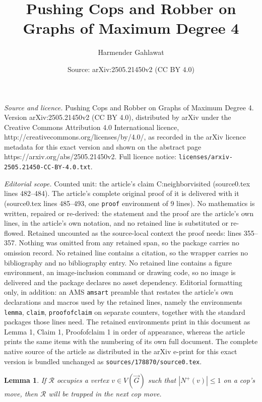 \documentclass[10pt,a4paper]{amsart}
\title{Pushing Cops and Robber on Graphs of Maximum Degree 4}
\author{Harmender Gahlawat}
\date{Source: arXiv:2505.21450v2 (CC BY 4.0)}
\newtheorem{lemma}{Lemma}
\newcommand{\R}{\mathcal{R}}
\begin{document}
\maketitle

\noindent\emph{Source and licence.} Pushing Cops and Robber on Graphs of Maximum Degree 4. Version arXiv:2505.21450v2 (CC BY 4.0), distributed by arXiv under the Creative Commons Attribution 4.0 International licence, http://creativecommons.org/licenses/by/4.0/, as recorded in the arXiv licence metadata for this exact version and shown on the abstract page https://arxiv.org/abs/2505.21450v2. Full licence notice: \texttt{licenses/arxiv-2505.21450-CC-BY-4.0.txt}.\par\smallskip

\noindent\textit{Editorial scope.} Counted unit: the article's claim C:neighborvisited (source0.tex lines 482--484). The article's complete original proof of it is delivered with it (source0.tex lines 485--493, one \texttt{proof} environment of 9 lines). No mathematics is written, repaired or re-derived: the statement and the proof are the article's own lines, in the article's own notation, and no retained line is substituted or re-flowed.  Retained uncounted as the source-local context the proof needs: lines 355--357.  Nothing was omitted from any retained span, so the package carries no omission record.  No retained line contains a citation, so the wrapper carries no bibliography and no bibliography entry.  No retained line contains a figure environment, an image-inclusion command or drawing code, so no image is delivered and the package declares no asset dependency.  Editorial formatting only, in addition: an AMS \texttt{amsart} preamble that restates the article's own declarations and macros used by the retained lines, namely the environments \texttt{lemma}, \texttt{claim}, \texttt{proofofclaim} on separate counters, together with the standard packages those lines need.  The retained environments print in this document as Lemma 1, Claim 1, Proofofclaim 1 in order of appearance, whereas the article prints the same items with the numbering of its own full document.  The complete native source of the article as distributed in the arXiv e-print for this exact version is bundled unchanged as \texttt{sources/178870/source0.tex}.
\begin{lemma}\label{L:trivial}
    If $\R$ occupies a vertex $v\in V(\overrightarrow{G})$ such that $|N^+(v)| \leq 1$ on a cop's move, then $\R$ will be trapped in the next cop move.
\end{lemma}
\end{document}
